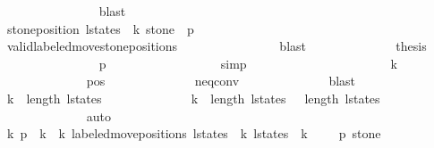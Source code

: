 \begin{isabellebody}
\ \ \ \ \ \ \ \ \ \ \ \ \ \ \isamarkupfalse%
\ blast\isanewline
\ \ \ \ \ \ \ \ \ \ \ \ \isamarkupfalse%
\isanewline
\ \ \ \ \ \ \ \ \ \ \ \ \isamarkupfalse%
\ {\isachardoublequoteopen}stone{\isacharunderscore}position\ {\isacharparenleft}l{\isacharunderscore}states\ {\isacharbang}\ k{\isacharparenright}\ stone\ {\isacharequal}\ p{}{\isacharprime}{\isachardoublequoteclose}\isanewline
\ \ \ \ \ \ \ \ \ \ \ \ \ \ \isamarkupfalse%
\ valid{\isacharunderscore}labeled{\isacharunderscore}move{\isacharprime}{\isacharunderscore}stone{\isacharunderscore}positions\isanewline
\ \ \ \ \ \ \ \ \ \ \ \ \ \ \isamarkupfalse%
\ blast\isanewline
\ \ \ \ \ \ \ \ \ \ \ \ \isamarkupfalse%
\ {\isacharquery}thesis\isanewline
\ \ \ \ \ \ \ \ \ \ \ \ \ \ \isamarkupfalse%
\ {\isacharbackquoteopen}p{}{\isacharprime}\ {\isasymnoteq}\ {}{\isacharbackquoteclose}\isanewline
\ \ \ \ \ \ \ \ \ \ \ \ \ \ \isamarkupfalse%
\ simp\isanewline
\ \ \ \ \ \ \ \ \ \ \isamarkupfalse%
\isanewline
\ \ \ \ \ \ \ \ \ \ \isamarkupfalse%
\ {\isachardoublequoteopen}k\ {\isachargreater}\ {}{\isachardoublequoteclose}\isanewline
\ \ \ \ \ \ \ \ \ \ \ \ \isamarkupfalse%
\ pos{}\isanewline
\ \ \ \ \ \ \ \ \ \ \ \ \isamarkupfalse%
\ neq{}{\isacharunderscore}conv\isanewline
\ \ \ \ \ \ \ \ \ \ \ \ \isamarkupfalse%
\ blast\isanewline
\ \ \ \ \ \ \ \ \ \ \isamarkupfalse%
\ {\isachardoublequoteopen}k\ {\isacharless}\ length\ l{\isacharunderscore}states{\isachardoublequoteclose}\isanewline
\ \ \ \ \ \ \ \ \ \ \ \ \isamarkupfalse%
\ {\isacharbackquoteopen}k\ {\isacharless}\ length\ l{\isacharunderscore}states\ {\isacharminus}\ {}{\isacharbackquoteclose}\ {\isacharbackquoteopen}length\ l{\isacharunderscore}states\ {\isasymge}\ {}{\isacharbackquoteclose}\ \isanewline
\ \ \ \ \ \ \ \ \ \ \ \ \isamarkupfalse%
\ auto\isanewline
\ \ \ \ \ \ \ \ \ \ \isamarkupfalse%
\ \isamarkupfalse%
\ k{\isacharprime}\ p{}{\isacharprime}{\isacharprime}\ \ {\isachardoublequoteopen}k{\isacharprime}\ {\isacharless}\ k{\isachardoublequoteclose}\ {\isachardoublequoteopen}labeled{\isacharunderscore}move{\isacharunderscore}positions\ {\isacharparenleft}l{\isacharunderscore}states\ {\isacharbang}\ k{\isacharprime}{\isacharparenright}\ {\isacharparenleft}l{\isacharunderscore}states\ {\isacharbang}\ {\isacharparenleft}k{\isacharprime}\ {\isacharplus}\ {}{\isacharparenright}{\isacharparenright}\ {\isacharequal}\ {\isacharparenleft}{}{\isacharcomma}\ p{}{\isacharprime}{\isacharprime}{\isacharcomma}\ stone{\isacharparenright}{\isachardoublequoteclose}\isanewline

\end{isabellebody}
